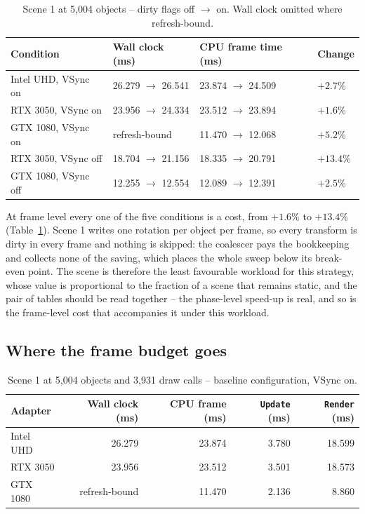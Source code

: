 \begin{table}[H]
\centering\small\setlength{\tabcolsep}{5pt}
\caption{Scene 1 at 5{,}004 objects -- dirty flags off $\rightarrow$ on. Wall clock omitted where refresh-bound.}
\label{tab:dirty-frame}
\begin{tabular}{llll}
\toprule
Condition & Wall clock (ms) & CPU frame time (ms) & Change \\
\midrule
Intel UHD, VSync on & 26.279 $\rightarrow$ 26.541 & 23.874 $\rightarrow$ 24.509 & $+2.7$\% \\
RTX 3050, VSync on  & 23.956 $\rightarrow$ 24.334 & 23.512 $\rightarrow$ 23.894 & $+1.6$\% \\
GTX 1080, VSync on  & refresh-bound               & 11.470 $\rightarrow$ 12.068 & $+5.2$\% \\
RTX 3050, VSync off & 18.704 $\rightarrow$ 21.156 & 18.335 $\rightarrow$ 20.791 & $\mathbf{+13.4}$\% \\
GTX 1080, VSync off & 12.255 $\rightarrow$ 12.554 & 12.089 $\rightarrow$ 12.391 & $+2.5$\% \\
\bottomrule
\end{tabular}
\end{table}

At frame level every one of the five conditions is a cost, from $+1.6$\% to $+13.4$\% (Table~\ref{tab:dirty-frame}). Scene 1 writes one rotation per object per frame, so every transform is dirty in every frame and nothing is skipped: the coalescer pays the bookkeeping and collects none of the saving, which places the whole sweep below its break-even point. The scene is therefore the least favourable workload for this strategy, whose value is proportional to the fraction of a scene that remains static, and the pair of tables should be read together -- the phase-level speed-up is real, and so is the frame-level cost that accompanies it under this workload.

\subsection{Where the frame budget goes}
\label{sec:res-crossdevice}

\begin{table}[H]
\centering\small\setlength{\tabcolsep}{5pt}
\caption{Scene 1 at 5{,}004 objects and 3{,}931 draw calls -- baseline configuration, VSync on.}
\label{tab:cpubound}
\begin{tabular}{lrrrr}
\toprule
Adapter & Wall clock (ms) & CPU frame (ms) & \texttt{Update} (ms) & \texttt{Render} (ms) \\
\midrule
Intel UHD & 26.279 & 23.874 & 3.780 & 18.599 \\
RTX 3050  & 23.956 & 23.512 & 3.501 & 18.573 \\
GTX 1080  & refresh-bound & 11.470 & 2.136 & 8.860 \\
\bottomrule
\end{tabular}
\end{table}

